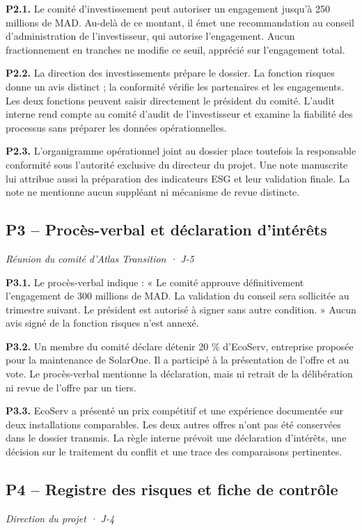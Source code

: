 \documentclass[11pt,a4paper]{article}
\begin{document}
\textbf{P2.1.} Le comité d’investissement peut autoriser un engagement jusqu’à 250 millions de MAD. Au-delà de ce montant, il émet une recommandation au conseil d’administration de l’investisseur, qui autorise l’engagement. Aucun fractionnement en tranches ne modifie ce seuil, apprécié sur l’engagement total.

\textbf{P2.2.} La direction des investissements prépare le dossier. La fonction risques donne un avis distinct ; la conformité vérifie les partenaires et les engagements. Les deux fonctions peuvent saisir directement le président du comité. L’audit interne rend compte au comité d’audit de l’investisseur et examine la fiabilité des processus sans préparer les données opérationnelles.

\textbf{P2.3.} L’organigramme opérationnel joint au dossier place toutefois la responsable conformité sous l’autorité exclusive du directeur du projet. Une note manuscrite lui attribue aussi la préparation des indicateurs ESG et leur validation finale. La note ne mentionne aucun suppléant ni mécanisme de revue distincte.

\subsection{P3 -- Procès-verbal et déclaration d’intérêts}
\textit{Réunion du comité d’Atlas Transition · J-5}

\textbf{P3.1.} Le procès-verbal indique : « Le comité approuve définitivement l’engagement de 300 millions de MAD. La validation du conseil sera sollicitée au trimestre suivant. Le président est autorisé à signer sans autre condition. » Aucun avis signé de la fonction risques n’est annexé.

\textbf{P3.2.} Un membre du comité déclare détenir 20 \% d’EcoServ, entreprise proposée pour la maintenance de SolarOne. Il a participé à la présentation de l’offre et au vote. Le procès-verbal mentionne la déclaration, mais ni retrait de la délibération ni revue de l’offre par un tiers.

\textbf{P3.3.} EcoServ a présenté un prix compétitif et une expérience documentée sur deux installations comparables. Les deux autres offres n’ont pas été conservées dans le dossier transmis. La règle interne prévoit une déclaration d’intérêts, une décision sur le traitement du conflit et une trace des comparaisons pertinentes.

\subsection{P4 -- Registre des risques et fiche de contrôle}
\textit{Direction du projet · J-4}
\end{document}
